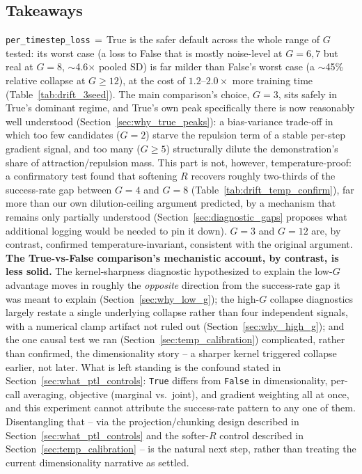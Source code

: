 \documentclass[11pt]{article}
\begin{document}
\subsection{Takeaways}

\texttt{per\_timestep\_loss}\,$=$\,True is the safer default across the
whole range of $G$ tested: its worst case (a loss to False that is
mostly noise-level at $G=6,7$ but real at $G=8$, $\sim$4.6$\times$ pooled
SD) is far milder than False's worst case (a $\sim$45\% relative
collapse at $G\ge12$), at the cost of $1.2$--$2.0\times$ more training
time (Table~\ref{tab:drift_3seed}). The
main comparison's choice, $G=3$, sits safely in True's dominant regime,
and True's own peak specifically there is now reasonably well
understood (Section~\ref{sec:why_true_peaks}): a bias-variance trade-off
in which too few candidates ($G=2$) starve the repulsion term of a
stable per-step gradient signal, and too many ($G\ge5$) structurally
dilute the demonstration's share of attraction/repulsion mass. This part
is not, however, temperature-proof: a confirmatory test found that
softening $R$ recovers roughly two-thirds of the success-rate gap
between $G=4$ and $G=8$ (Table~\ref{tab:drift_temp_confirm}), far more
than our own dilution-ceiling argument predicted, by a mechanism that
remains only partially understood (Section~\ref{sec:diagnostic_gaps}
proposes what additional logging would be needed to pin it down). $G=3$
and $G=12$ are, by contrast, confirmed temperature-invariant, consistent
with the original argument.
\textbf{The True-vs-False comparison's mechanistic account, by
contrast, is less solid.} The kernel-sharpness diagnostic hypothesized to explain
the low-$G$ advantage moves in roughly the \emph{opposite} direction from
the success-rate gap it was meant to explain
(Section~\ref{sec:why_low_g}); the high-$G$ collapse diagnostics largely
restate a single underlying collapse rather than four independent
signals, with a numerical clamp artifact not ruled out
(Section~\ref{sec:why_high_g}); and the one causal test we ran
(Section~\ref{sec:temp_calibration}) complicated, rather than confirmed,
the dimensionality story -- a sharper kernel triggered collapse earlier,
not later. What is left standing is the confound stated in
Section~\ref{sec:what_ptl_controls}: \texttt{True} differs from
\texttt{False} in dimensionality, per-call averaging, objective
(marginal vs.\ joint), and gradient weighting all at once, and this
experiment cannot attribute the success-rate pattern to any one of them.
Disentangling that -- via the projection/chunking design described in
Section~\ref{sec:what_ptl_controls} and the softer-$R$ control described
in Section~\ref{sec:temp_calibration} -- is the natural next step, rather
than treating the current dimensionality narrative as settled.
\end{document}
